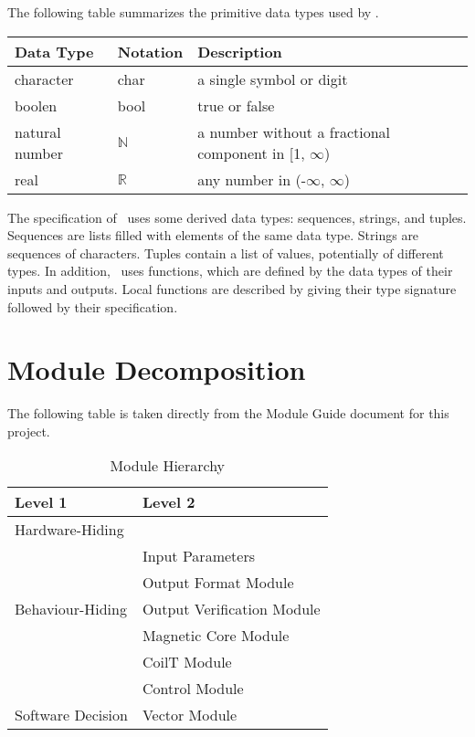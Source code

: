 \documentclass[12pt, titlepage]{article}
\begin{document}
The following table summarizes the primitive data types used by \progname. 

\begin{center}
\renewcommand{\arraystretch}{1.2}
\noindent 
\begin{tabular}{l l p{7.5cm}} 
\toprule 
\textbf{Data Type} & \textbf{Notation} & \textbf{Description}\\ 
\midrule
character & char & a single symbol or digit\\
boolen & bool & true or false \\
natural number & $\mathbb{N}$ & a number without a fractional component in [1, $\infty$) \\
real & $\mathbb{R}$ & any number in (-$\infty$, $\infty$)\\
\bottomrule
\end{tabular} 
\end{center}

\noindent
The specification of \progname \ uses some derived data types: sequences, strings, and
tuples. Sequences are lists filled with elements of the same data type. Strings
are sequences of characters. Tuples contain a list of values, potentially of
different types. In addition, \progname \ uses functions, which
are defined by the data types of their inputs and outputs. Local functions are
described by giving their type signature followed by their specification.

\section{Module Decomposition}

The following table is taken directly from the Module Guide document for this project.

\begin{table}[h!]
\centering
\begin{tabular}{p{} p{}}
\toprule
\textbf{Level 1} & \textbf{Level 2}\\
\midrule

{Hardware-Hiding} & ~ \\
\midrule

\multirow{5}{0.3\textwidth}{Behaviour-Hiding} & Input Parameters\\
& Output Format Module\\
& Output Verification Module\\
& Magnetic Core Module\\
& CoilT Module\\
& Control Module\\
\midrule

\multirow{1}{0.3\textwidth}{Software Decision} & Vector Module\\

\bottomrule

\end{tabular}
\caption{Module Hierarchy}
\label{TblMH}
\end{table}
\end{document}
